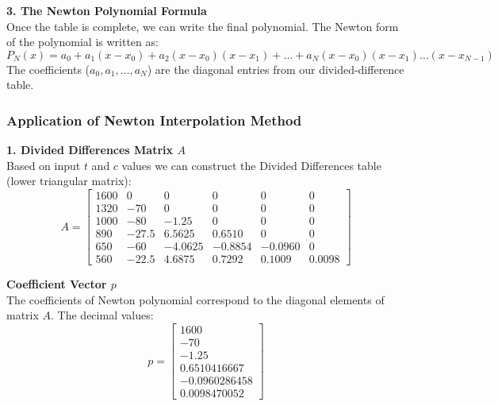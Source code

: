 \documentclass{article}
\begin{document}
\vspace{5pt}
\noindent \textbf{3. The Newton Polynomial Formula} \cite[page 220 - 221]{MathewsFink2003} \\
Once the table is complete, we can write the final polynomial. The Newton form of the polynomial is written as:
\begin{equation}
    P_N(x) = a_0 + a_1(x - x_0) + a_2(x - x_0)(x - x_1) + \dots + a_N(x - x_0)(x - x_1)\dots(x - x_{N-1})
\end{equation}
The coefficients ($a_0, a_1, \dots, a_N$) are the diagonal entries from our divided-difference table.

\vspace{5pt}
\subsubsection{Application of Newton Interpolation Method}
\noindent \textbf{1. Divided Differences Matrix $A$} \\
Based on input $t$ and $c$ values we can construct the Divided Differences table (lower triangular matrix):
\begin{equation*}
    A = \begin{bmatrix} 
        1600 & 0 & 0 & 0 & 0 & 0 \\ 
        1320 & -70 & 0 & 0 & 0 & 0 \\ 
        1000 & -80 & -1.25 & 0 & 0 & 0 \\ 
        890 & -27.5 & 6.5625 & 0.6510 & 0 & 0 \\ 
        650 & -60 & -4.0625 & -0.8854 & -0.0960 & 0 \\ 
        560 & -22.5 & 4.6875 & 0.7292 & 0.1009 & 0.0098 
    \end{bmatrix}
\end{equation*}

\vspace{5pt}
\noindent \textbf{Coefficient Vector $p$} \\
The coefficients of Newton polynomial correspond to the diagonal elements of matrix $A$. The decimal values:
\begin{equation*}
    p = \begin{bmatrix} 
        1600 \\ -70 \\ -1.25 \\ 0.6510416667 \\ -0.0960286458 \\ 0.0098470052 
    \end{bmatrix}
\end{equation*}
\end{document}
